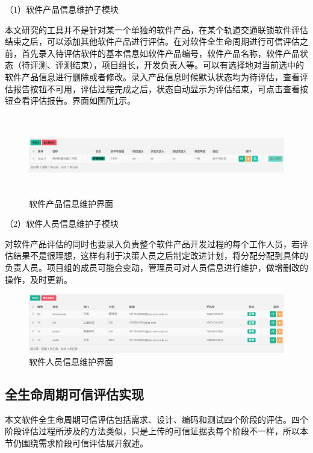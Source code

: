 （1）软件产品信息维护子模块

本文研究的工具并不是针对某一个单独的软件产品，在某个轨道交通联锁软件评估结束之后，可以添加其他软件产品进行评估。在对软件全生命周期进行可信评估之前，首先录入待评估软件的基本信息如软件产品编号，软件产品名称，软件产品状态（待评测、评测结束），项目组长，开发负责人等。可以有选择地对当前选中的软件产品信息进行删除或者修改。录入产品信息时候默认状态均为待评估，查看评估报告按钮不可用，评估过程完成之后，状态自动显示为评估结束，可点击查看按钮查看评估报告。界面如图所\ref{fig:5_04}示。

\begin{figure}[htb]
	\centering
	\includegraphics[width=14cm,height=3.5cm]{fig/5_04.png}
	\caption{软件产品信息维护界面}
	\label{fig:5_04}
\end{figure}


（2）软件人员信息维护子模块

对软件产品评估的同时也要录入负责整个软件产品开发过程的每个工作人员，若评估结果不是很理想，这样有利于决策人员之后制定改进计划，将分配分配到具体的负责人员。项目组的成员可能会变动，管理员可对人员信息进行维护，做增删改的操作，及时更新。

\begin{figure}[htb]
	\centering
	\includegraphics[width=13cm]{fig/5_05.png}
	\caption{软件人员信息维护界面}
	\label{fig:5_05}
\end{figure}

\subsection{全生命周期可信评估实现}

本文软件全生命周期可信评估包括需求、设计、编码和测试四个阶段的评估。四个阶段评估过程所涉及的方法类似，只是上传的可信证据表每个阶段不一样，所以本节仍围绕需求阶段可信评估展开叙述。

